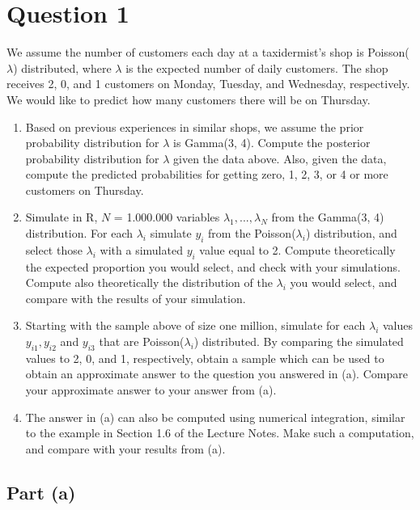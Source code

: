 \documentclass{article}
\begin{document}
\section{Question 1}
We assume the number of customers each day at a taxidermist's shop is
Poisson($\lambda$) distributed, where $\lambda$ is the expected number of daily customers.
The shop receives 2, 0, and 1 customers on Monday, Tuesday, and Wednesday,
respectively. We would like to predict how many customers there will
be on Thursday.
\begin{enumerate}[label=(\alph*)]
    \item Based on previous experiences in similar shops, we assume the prior
        probability distribution for $\lambda$ is Gamma(3, 4). Compute the posterior
        probability distribution for $\lambda$ given the data above. Also, given the
        data, compute the predicted probabilities for getting zero, 1, 2, 3, or
        4 or more customers on Thursday.
    \item Simulate in R, $N$ = 1.000.000 variables $\lambda_1, ..., \lambda_N$ from the Gamma(3, 4)
        distribution. For each $\lambda_i$ simulate $y_i$ from the Poisson($\lambda_i$) distribution,
        and select those $\lambda_i$ with a simulated $y_i$ value equal to 2.
        Compute theoretically the expected proportion you would select, and
        check with your simulations. Compute also theoretically the distribution
        of the $\lambda_i$ you would select, and compare with the results of
        your simulation.
    \item Starting with the sample above of size one million, simulate for each
        $\lambda_i$ values $y_{i1}, y_{i2}$ and $y_{i3}$ that are Poisson($\lambda_i$) distributed. 
        By comparing the simulated values to 2, 0, and 1, respectively, obtain a
        sample which can be used to obtain an approximate answer to the
        question you answered in (a). Compare your approximate answer to
        your answer from (a).
    \item The answer in (a) can also be computed using numerical integration,
        similar to the example in Section 1.6 of the Lecture Notes. Make
        such a computation, and compare with your results from (a).
\end{enumerate}

\subsection{Part (a)}
\end{document}
